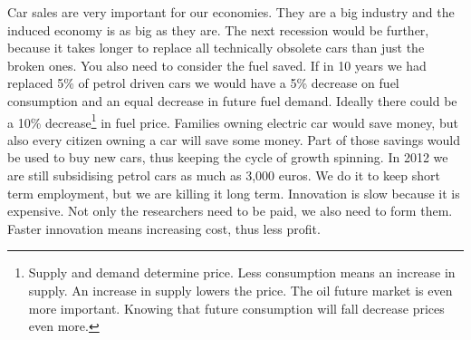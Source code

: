 \documentclass{article}
\begin{document}
Car sales are very important for our economies.
They are a big industry and the induced economy is as big as they are.
The next recession would be further, because it takes longer to replace all technically obsolete cars than just the broken ones.
You also need to consider the fuel saved.
If in 10 years we had replaced 5\% of petrol driven cars we would have a 5\% decrease on fuel consumption and an equal decrease in future fuel demand. Ideally there could be a 10\% decrease\footnote{Supply and demand determine price. Less consumption means an increase in supply. An increase in supply lowers the price. The oil future market is even more important. Knowing that future consumption will fall decrease prices even more.} in fuel price.
Families owning electric car would save money, but also every citizen owning a car will save some money.
Part of those savings would be used to buy new cars, thus keeping the cycle of growth spinning.
In 2012 we are still subsidising petrol cars as much as 3,000 euros.
We do it to keep short term employment, but we are killing it long term.
Innovation is slow because it is expensive.
Not only the researchers need to be paid, we also need to form them.
Faster innovation means increasing cost, thus less profit.
\end{document}
